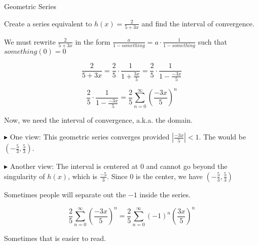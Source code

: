 \documentclass{ximera}
\begin{document}
\begin{example} Geometric Series



Create a series equivalent to $h(x) = \frac{2}{5 + 3x}$ and find the interval of convergence.



\begin{explanation}


We must rewrite $\frac{2}{5 + 3x}$ in the form $\frac{a}{1-something} = a \cdot \frac{1}{1-something}$ such that $something(0) = 0$




\[     \frac{2}{5 + 3x}  =   \frac{2}{5} \cdot \frac{1}{1 + \frac{3x}{5}}  =   \frac{2}{5} \cdot \frac{1}{1 - \frac{-3x}{5}}  \]



\[  \frac{2}{5} \cdot \frac{1}{1 - \frac{-3x}{5}}=  \frac{2}{5} \sum\limits_{n=0}^{\infty} \left(\frac{-3x}{5}\right)^n       \]





Now, we need the interval of convergence, a.k.a. the domain.  


$\blacktriangleright$ One view:  This geometric series converges provided   $\left| \frac{-3x}{5} \right| < 1$.  The would be $\left(-\frac{5}{3}, \frac{5}{3} \right)$.



$\blacktriangleright$ Another view: The interval is centered at $0$ and cannot go beyond the singularity of $h(x)$, which is $\frac{-5}{3}$.  Since $0$ is the center, we have $\left(-\frac{5}{3}, \frac{5}{3} \right)$


\end{explanation}


Sometimes people will separate out the $-1$ inside the series.

\[  \frac{2}{5} \sum\limits_{n=0}^{\infty} \left(\frac{-3x}{5}\right)^n    =   \frac{2}{5} \sum\limits_{n=0}^{\infty} (-1)^n \left(\frac{3x}{5}\right)^n   \]


Sometimes that is easier to read.


\end{example}
\end{document}

